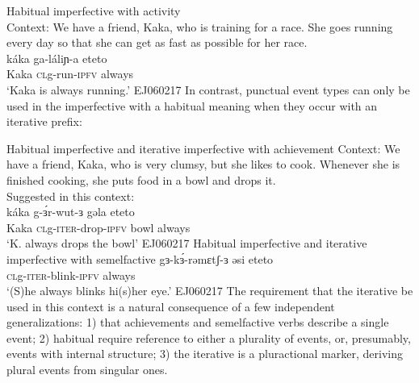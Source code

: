 \ex Habitual imperfective with activity\\
	Context: We have a friend, Kaka, who is training for a race. She goes running every day so that she can get as fast as possible for her race.\\
		\gll káka ga-láliɲ-a eteto\\
			Kaka \textsc{cl}g-run-\textsc{ipfv} always\\
		\glt `Kaka is always running.'  \hfill EJ060217
\z
In contrast, punctual event types can only be used in the imperfective with a habitual meaning when they occur with an iterative prefix:

\ea Habitual imperfective and iterative imperfective with achievement	
	Context: We have a friend, Kaka, who is very clumsy, but she likes to cook. Whenever she is finished cooking, she puts food in a bowl and drops it.\\
	\ex Suggested in this context:\\
		\gll káka g-ɜ́r-wut-ɜ gəla eteto\\
			 Kaka \textsc{cl}g-\textsc{iter}-drop-\textsc{ipfv} bowl always\\
		\glt `K. always drops the bowl'  \hfill EJ060217
	\z
\ex  Habitual imperfective and iterative imperfective with semelfactive	
	\ex  \gll gɜ-kɜ́-rəmɛtʃ-ɜ əsi eteto\\
			 \textsc{cl}g-\textsc{iter}-blink-\textsc{ipfv} always\\
		\glt `(S)he always blinks hi(s)her eye.' \hfill EJ060217
	\z
\z
The requirement that the iterative be used in this context is a natural consequence of a few independent generalizations: 1) that achievements and semelfactive verbs describe a single event; 2) habitual require reference to either a plurality of events, or, presumably, events with internal structure; 3) the iterative is a pluractional marker, deriving plural events from singular ones.

%
%

